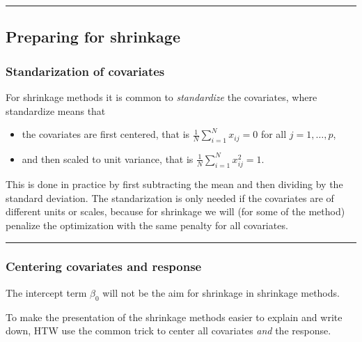 \documentclass[
  letterpaper,
  DIV=11,
  numbers=noendperiod]{scrartcl}
\providecommand{\tightlist}{%
  \setlength{\itemsep}{0pt}\setlength{\parskip}{0pt}}\usepackage{longtable,booktabs,array}
\begin{document}
\begin{center}\rule{0.5\linewidth}{0.5pt}\end{center}

\hypertarget{preparing-for-shrinkage}{%
\subsection{Preparing for shrinkage}\label{preparing-for-shrinkage}}

\hypertarget{standarization-of-covariates}{%
\subsubsection{Standarization of
covariates}\label{standarization-of-covariates}}

For shrinkage methods it is common to \emph{standardize} the covariates,
where standardize means that

\begin{itemize}
\tightlist
\item
  the covariates are first centered, that is
  \(\frac{1}{N}\sum_{i=1}^N x_{ij}=0\) for all \(j=1,\ldots, p\),
\item
  and then scaled to unit variance, that is
  \(\frac{1}{N}\sum_{i=1}^N x^2_{ij}=1\).
\end{itemize}

This is done in practice by first subtracting the mean and then dividing
by the standard deviation. The standarization is only needed if the
covariates are of different units or scales, because for shrinkage we
will (for some of the method) penalize the optimization with the same
penalty for all covariates.

\begin{center}\rule{0.5\linewidth}{0.5pt}\end{center}

\hypertarget{centering-covariates-and-response}{%
\subsubsection{Centering covariates and
response}\label{centering-covariates-and-response}}

The intercept term \(\beta_0\) will not be the aim for shrinkage in
shrinkage methods.

To make the presentation of the shrinkage methods easier to explain and
write down, HTW use the common trick to center all covariates \emph{and}
the response.
\end{document}
